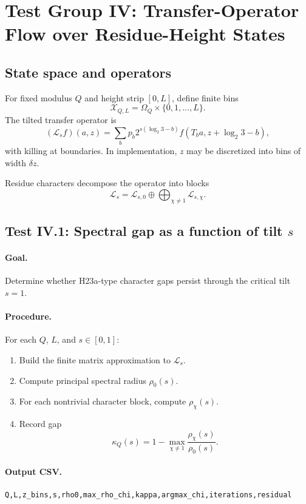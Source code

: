 \documentclass[11pt]{article}
\begin{document}
\section{Test Group IV: Transfer-Operator Flow over Residue-Height States}

\subsection{State space and operators}

For fixed modulus $Q$ and height strip $[0,L]$, define finite bins
\[
  \mathcal X_{Q,L}=\Omega_Q\times\{0,1,\ldots,L\}.
\]
The tilted transfer operator is
\[
  (\mathcal L_s f)(a,z)=\sum_b p_b2^{s(\log_2 3-b)}f(T_ba,z+\log_2 3-b),
\]
with killing at boundaries. In implementation, $z$ may be discretized into bins of width $\delta z$.

Residue characters decompose the operator into blocks
\[
  \mathcal L_s=\mathcal L_{s,0}\oplus\bigoplus_{\chi\ne1}\mathcal L_{s,\chi}.
\]

\subsection{Test IV.1: Spectral gap as a function of tilt $s$}

\paragraph{Goal.} Determine whether H23a-type character gaps persist through the critical tilt $s=1$.

\paragraph{Procedure.}
For each $Q$, $L$, and $s\in[0,1]$:
\begin{enumerate}
  \item Build the finite matrix approximation to $\mathcal L_s$.
  \item Compute principal spectral radius $\rho_0(s)$.
  \item For each nontrivial character block, compute $\rho_\chi(s)$.
  \item Record gap
  \[
    \kappa_Q(s)=1-\max_{\chi\ne1}\frac{\rho_\chi(s)}{\rho_0(s)}.
  \]
\end{enumerate}

\paragraph{Output CSV.}
\begin{verbatim}
Q,L,z_bins,s,rho0,max_rho_chi,kappa,argmax_chi,iterations,residual
\end{verbatim}
\end{document}
